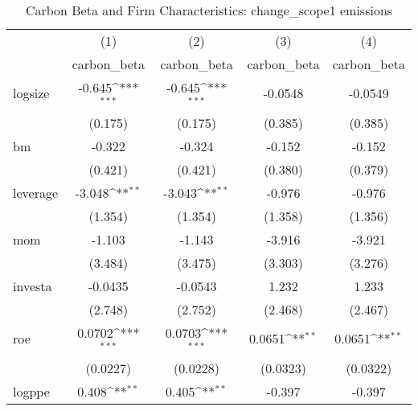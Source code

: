 \begin{table}[htbp]\centering
\def\sym#1{\ifmmode^{#1}\else\(^{#1}\)\fi}
\caption{Carbon Beta and Firm Characteristics: change\_scope1 emissions}
\begin{tabular}{l*{4}{c}}
\hline\hline
                    &\multicolumn{1}{c}{(1)}&\multicolumn{1}{c}{(2)}&\multicolumn{1}{c}{(3)}&\multicolumn{1}{c}{(4)}\\
                    &\multicolumn{1}{c}{carbon\_beta}&\multicolumn{1}{c}{carbon\_beta}&\multicolumn{1}{c}{carbon\_beta}&\multicolumn{1}{c}{carbon\_beta}\\
\hline
logsize             &      -0.645\sym{***}&      -0.645\sym{***}&     -0.0548         &     -0.0549         \\
                    &     (0.175)         &     (0.175)         &     (0.385)         &     (0.385)         \\
[1em]
bm                  &      -0.322         &      -0.324         &      -0.152         &      -0.152         \\
                    &     (0.421)         &     (0.421)         &     (0.380)         &     (0.379)         \\
[1em]
leverage            &      -3.048\sym{**} &      -3.043\sym{**} &      -0.976         &      -0.976         \\
                    &     (1.354)         &     (1.354)         &     (1.358)         &     (1.356)         \\
[1em]
mom                 &      -1.103         &      -1.143         &      -3.916         &      -3.921         \\
                    &     (3.484)         &     (3.475)         &     (3.303)         &     (3.276)         \\
[1em]
investa             &     -0.0435         &     -0.0543         &       1.232         &       1.233         \\
                    &     (2.748)         &     (2.752)         &     (2.468)         &     (2.467)         \\
[1em]
roe                 &      0.0702\sym{***}&      0.0703\sym{***}&      0.0651\sym{**} &      0.0651\sym{**} \\
                    &    (0.0227)         &    (0.0228)         &    (0.0323)         &    (0.0322)         \\
[1em]
logppe              &       0.408\sym{**} &       0.405\sym{**} &      -0.397         &      -0.397         \\

\end{tabular}
\end{table}
